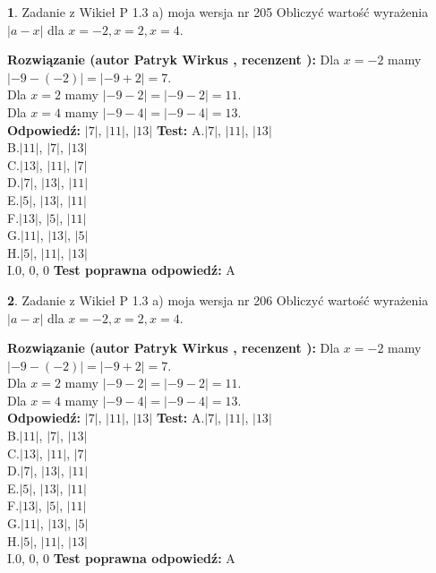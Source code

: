 \documentclass[12pt, a4paper]{article}
\theoremstyle{definition} %
\newtheorem{zad}{}
\newcommand{\zadStart}[1]{\begin{zad}#1\newline}
\newcommand{\zadStop}{\end{zad}}
\newcommand{\rozwStart}[2]{\noindent \textbf{Rozwiązanie (autor #1 , recenzent #2): }\newline}
\newcommand{\rozwStop}{\newline}
\newcommand{\odpStart}{\noindent \textbf{Odpowiedź:}\newline}
\newcommand{\odpStop}{\newline}
\newcommand{\testStart}{\noindent \textbf{Test:}\newline}
\newcommand{\testStop}{\newline}
\newcommand{\kluczStart}{\noindent \textbf{Test poprawna odpowiedź:}\newline}
\newcommand{\kluczStop}{\newline}
\begin{document}
\zadStart{Zadanie z Wikieł P 1.3 a) moja wersja nr 205}
Obliczyć wartość wyrażenia $|a - x|$ dla $x=-2,x=2,x=4$.
\zadStop
\rozwStart{Patryk Wirkus}{}
Dla $x = -2$ mamy $|-9 - (-2)| = |-9 + 2| = 7$.\\
Dla $x = 2$ mamy $|-9 - 2| = |-9 - 2| = 11$.\\
Dla $x = 4$ mamy $|-9 - 4| = |-9 - 4| = 13$.\\
\rozwStop
\odpStart
$|7|$, $|11|$, $|13|$
\odpStop
\testStart
A.$|7|$, $|11|$, $|13|$\\
B.$|11|$, $|7|$, $|13|$\\
C.$|13|$, $|11|$, $|7|$\\
D.$|7|$, $|13|$, $|11|$\\
E.$|5|$, $|13|$, $|11|$\\
F.$|13|$, $|5|$, $|11|$\\
G.$|11|$, $|13|$, $|5|$\\
H.$|5|$, $|11|$, $|13|$\\
I.$0$, $0$, $0$
\testStop
\kluczStart
A
\kluczStop



\zadStart{Zadanie z Wikieł P 1.3 a) moja wersja nr 206}
Obliczyć wartość wyrażenia $|a - x|$ dla $x=-2,x=2,x=4$.
\zadStop
\rozwStart{Patryk Wirkus}{}
Dla $x = -2$ mamy $|-9 - (-2)| = |-9 + 2| = 7$.\\
Dla $x = 2$ mamy $|-9 - 2| = |-9 - 2| = 11$.\\
Dla $x = 4$ mamy $|-9 - 4| = |-9 - 4| = 13$.\\
\rozwStop
\odpStart
$|7|$, $|11|$, $|13|$
\odpStop
\testStart
A.$|7|$, $|11|$, $|13|$\\
B.$|11|$, $|7|$, $|13|$\\
C.$|13|$, $|11|$, $|7|$\\
D.$|7|$, $|13|$, $|11|$\\
E.$|5|$, $|13|$, $|11|$\\
F.$|13|$, $|5|$, $|11|$\\
G.$|11|$, $|13|$, $|5|$\\
H.$|5|$, $|11|$, $|13|$\\
I.$0$, $0$, $0$
\testStop
\kluczStart
A
\kluczStop
\end{document}
